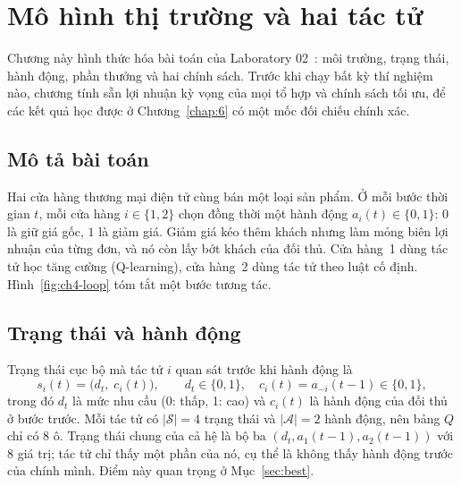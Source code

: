 \chapter{Mô hình thị trường và hai tác tử}\label{chap:4}

Chương này hình thức hóa bài toán của Laboratory 02~\cite{lab02}: môi trường, trạng thái, hành động, phần
thưởng và hai chính sách. Trước khi chạy bất kỳ thí nghiệm nào, chương tính sẵn lợi nhuận kỳ vọng của mọi tổ hợp
và chính sách tối ưu, để các kết quả học được ở Chương~\ref{chap:6} có một mốc đối chiếu chính xác.

\section{Mô tả bài toán}

Hai cửa hàng thương mại điện tử cùng bán một loại sản phẩm. Ở mỗi bước thời gian $t$, mỗi cửa hàng $i\in\{1,2\}$
chọn đồng thời một hành động $a_i(t)\in\{0,1\}$: $0$ là giữ giá gốc, $1$ là giảm giá. Giảm giá kéo thêm khách
nhưng làm mỏng biên lợi nhuận của từng đơn, và nó còn lấy bớt khách của đối thủ. Cửa hàng~1 dùng tác tử học tăng
cường (Q-learning), cửa hàng~2 dùng tác tử theo luật cố định. Hình~\ref{fig:ch4-loop} tóm tắt một bước tương tác.



\section{Trạng thái và hành động}

Trạng thái cục bộ mà tác tử $i$ quan sát trước khi hành động là
\begin{equation}\label{eq:state}
  s_i(t) = \bigl(d_t,\; c_i(t)\bigr),\qquad d_t\in\{0,1\},\quad c_i(t) = a_{-i}(t-1)\in\{0,1\},
\end{equation}
trong đó $d_t$ là mức nhu cầu (0: thấp, 1: cao) và $c_i(t)$ là hành động của đối thủ ở bước trước. Mỗi tác tử có
$|\mathcal S| = 4$ trạng thái và $|\mathcal A|=2$ hành động, nên bảng $Q$ chỉ có $8$ ô. Trạng thái chung của cả
hệ là bộ ba $(d_t, a_1(t-1), a_2(t-1))$ với $8$ giá trị; tác tử chỉ thấy một phần của nó, cụ thể là không thấy
hành động trước của chính mình. Điểm này quan trọng ở Mục~\ref{sec:best}.

